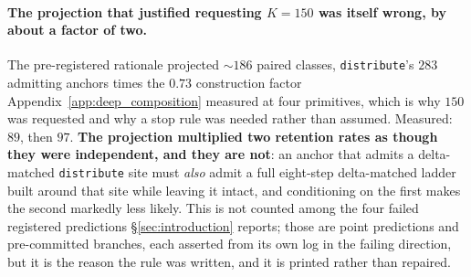 \paragraph{The projection that justified requesting $K{=}150$ was itself wrong, by about a factor of two.} The pre-registered rationale projected $\sim\!186$ paired classes, \texttt{distribute}'s $283$ admitting anchors times the $0.73$ construction factor Appendix~\ref{app:deep_composition} measured at four primitives, which is why $150$ was requested and why a stop rule was needed rather than assumed. Measured: $89$, then $97$. \textbf{The projection multiplied two retention rates as though they were independent, and they are not}: an anchor that admits a delta-matched \texttt{distribute} site must \emph{also} admit a full eight-step delta-matched ladder built around that site while leaving it intact, and conditioning on the first makes the second markedly less likely. This is not counted among the four failed registered predictions \S\ref{sec:introduction} reports; those are point predictions and pre-committed branches, each asserted from its own log in the failing direction, but it is the reason the rule was written, and it is printed rather than repaired.

